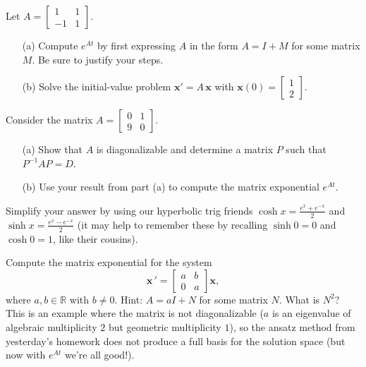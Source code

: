 \documentclass[11pt,letterpaper,boxed]{hmcpset}
\newcommand{\R}{\mathbb{R}}
\begin{document}
\begin{solution}
\vfill
\end{solution}
\newpage


\begin{problem}[4.] 
Let $A = \begin{bmatrix} 1 & 1  \\ -1 & 1  
\end{bmatrix}.$
\begin{enumerate}
\item[(a)] Compute $e^{At}$ by first expressing 
$A$  in the form  $A = I + M$ for some matrix $M$. Be sure to justify your steps. 
\item[(b)] Solve the initial-value problem $\mathbf{x}' = A \, \mathbf{x}$ with $\mathbf{x}(0)=  \begin{bmatrix} 1 \\ 2 \end{bmatrix}$. 
\end{enumerate}
\end{problem}

\begin{solution}
\vfill
\end{solution}
\newpage

\begin{problem}[5.] 
Consider the matrix $ A = \begin{bmatrix} 0 & 1  \\ 9 & 0 
\end{bmatrix}. $ 
\begin{enumerate}
\item[(a)] Show that $A$ is diagonalizable and determine a matrix $P$ such that $P^{-1} A P = D$.
\item[(b)] Use your result from part (a) to compute the matrix exponential $e^{At}$.
\end{enumerate}
Simplify your answer by using our hyperbolic trig friends $\cosh x = \frac{e^x + e^{-x}}{2}$ and $\sinh x = \frac{e^x - e^{-x}}{2}$ (it may help to remember these by recalling $\sinh 0 = 0$ and $\cosh 0 = 1$, like their cousins).
\end{problem}

\begin{solution}
\vfill
\end{solution}
\newpage


\begin{problem}[6.] Compute the matrix exponential for the system
\begin{equation}
 \mathbf{x} \, ' = \begin{bmatrix} a & b \\ 0 & a \end{bmatrix} \mathbf{x},\label{if}
 \end{equation}
where $a,b \in \R$ with $b \neq 0$. Hint: $A=aI + N$ for some matrix $N$. What is $N^2$? \\
This is an example where the matrix is not diagonalizable ($a$ is an eigenvalue of algebraic multiplicity $2$ but geometric multiplicity $1$), so the ansatz method from yesterday's homework does not produce a full basis for the solution space (but now with $e^{At}$ we're all good!). 
\end{problem}
\end{document}
